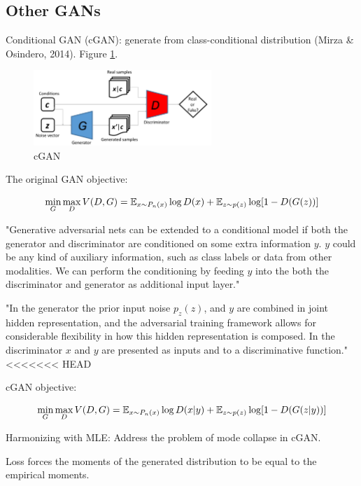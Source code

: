 \documentclass[english]{article}
\begin{document}
\eenum


\subsection{Other GANs}

\benum 
\item Conditional GAN (cGAN): generate from class-conditional distribution (Mirza \& Osindero, 2014). Figure \ref{cGAN}. 

\begin{figure}[h!]
  \centering
  \includegraphics[width=0.6\textwidth]{cgan.png}
    \caption{cGAN}
  \label{cGAN}
 \end{figure}


\item 
The original GAN objective: 

$$\min_G\max_D V(D,G) 
= \mathbb{E}_{x\sim P_n(x)}\log D(x) + 
\mathbb{E}_{z\sim p(z)} \log[1-D(G(z))] $$

"Generative adversarial nets can be extended to a conditional model if both the generator and discriminator are conditioned on some extra information $y$. $y$ could be any kind of auxiliary information,
such as class labels or data from other modalities. We can perform the conditioning by feeding $y$
into the both the discriminator and generator as additional input layer."

"In the generator the prior input noise $p_z(z)$, and $y$ are combined in joint hidden representation, and the adversarial training framework allows for considerable flexibility in how this hidden representation is composed.
In the discriminator $x$ and $y$ are presented as inputs and to a discriminative function."
<<<<<<< HEAD


cGAN objective: 

$$\min_G\max_D V(D,G) 
= \mathbb{E}_{x\sim P_n(x)}\log D(x|y) + 
\mathbb{E}_{z\sim p(z)} \log[1-D(G(z|y))] $$


\item 

Harmonizing with MLE: Address the problem of mode collapse in cGAN. 

Loss forces the moments of the generated distribution to be equal to the empirical moments. 
\end{document}
